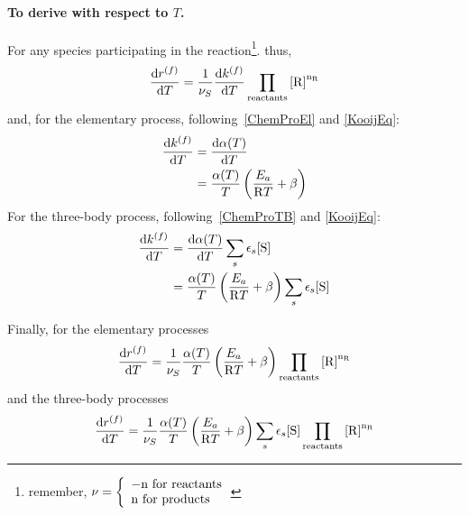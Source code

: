 \paragraph{To derive with respect to $T$.}
For any species  participating in the reaction\footnote{remember, 
$\scoef = \left\{\begin{array}{l}-\scoefabs\text{ for reactants}\\\scoefabs\text{ for products}\end{array}\right.$}.
thus,
\begin{equation}
\doverdT{\fwdrate} = \frac{1}{\scoef[S]}
                   \doverdT{\fwdratecons}
                   \prodReac
\end{equation}
and, for the elementary process, following~\ref{ChemProEl} and \ref{KooijEq}:
\begin{equation}
\begin{split}
\doverdT{\fwdratecons} &= \doverdT{\kinMod} \\
                     &= \frac{\kinMod}{T} \left(\frac{E_a}{\Rg T} + \beta\right)
\end{split}
\end{equation}
For the three-body process, following~\ref{ChemProTB} and \ref{KooijEq}:
\begin{equation}
\begin{split}
\doverdT{\fwdratecons} &= \doverdT{\kinMod} \threeBody \\
                     &= \frac{\kinMod}{T} \left(\frac{E_a}{\Rg T} + \beta\right) \threeBody
\end{split}
\end{equation}

Finally,
for the elementary processes
\begin{equation}
\doverdT{\fwdrate} = \frac{1}{\scoef[S]} \frac{\kinMod}{T} \left(\frac{E_a}{\Rg T} + \beta\right)
                                                \prodReac
\label{derivTEP}
\end{equation}
and the three-body processes
\begin{equation}
\doverdT{\fwdrate} = \frac{1}{\scoef[S]} \frac{\kinMod}{T} \left(\frac{E_a}{\Rg T} + \beta\right) \threeBody
                                                \prodReac
\label{derivTTB}
\end{equation}

